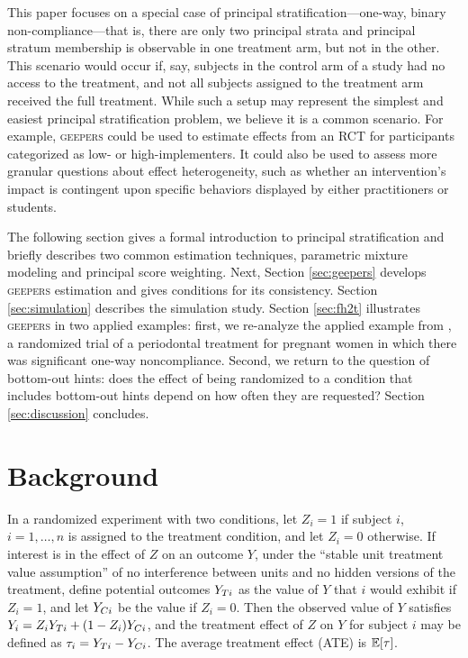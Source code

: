 \documentclass[]{article}
\begin{document}
This paper focuses on a special case of principal stratification---one-way, binary non-compliance---that is, there are only two principal strata and principal stratum membership is observable in one treatment arm, but not in the other.
This scenario would occur if, say, subjects in the control arm of a study had no access to the treatment, and not all subjects assigned to the treatment arm received the full treatment.
While such a setup may represent the simplest and easiest principal stratification problem, we believe it is a common scenario.
For example, \textsc{geepers} could be used to estimate effects from an RCT for participants categorized as low- or high-implementers. It could also be used to assess more granular questions about effect heterogeneity, such as whether an intervention's impact is contingent upon specific behaviors displayed by either practitioners or students.

The following section gives a formal introduction to principal stratification and briefly describes two common estimation techniques, parametric mixture modeling and principal score weighting.
Next, Section \ref{sec:geepers} develops \textsc{geepers} estimation and gives conditions for its consistency.
Section \ref{sec:simulation} describes the simulation study. %
Section \ref{sec:fh2t} illustrates \textsc{geepers} in two applied examples: first, we re-analyze the applied example from \citet{richardson2023estimating}, a randomized trial of a periodontal treatment for pregnant women in which there was significant one-way noncompliance. Second, we return to the question of bottom-out hints: does the effect of being randomized to a condition that includes bottom-out hints depend on how often they are requested?  Section \ref{sec:discussion} concludes.


\section{Background}
In a randomized experiment with two conditions, let $Z_i=1$ if subject $i$, $i=1,\dots,n$ is assigned to the treatment condition, and let $Z_i=0$ otherwise.
If interest is in the effect of $Z$ on an outcome $Y$, under the ``stable unit treatment value assumption'' \citep{air} of no interference between units and no hidden versions of the treatment, define potential outcomes \citep{splawa1990application} $Y_{Ti}$ as the value of $Y$ that $i$ would exhibit if $Z_i=1$, and let $Y_{Ci}$ be the value if $Z_i=0$. Then the observed value of $Y$ satisfies $Y_i=Z_iY_{Ti}+(1-Z_i)Y_{Ci}$, and the treatment effect of $Z$ on $Y$ for subject $i$ may be defined as $\tau_i=Y_{Ti}-Y_{Ci}$. The average treatment effect (ATE) is $\mathbb{E}[\tau]$. %
\end{document}
